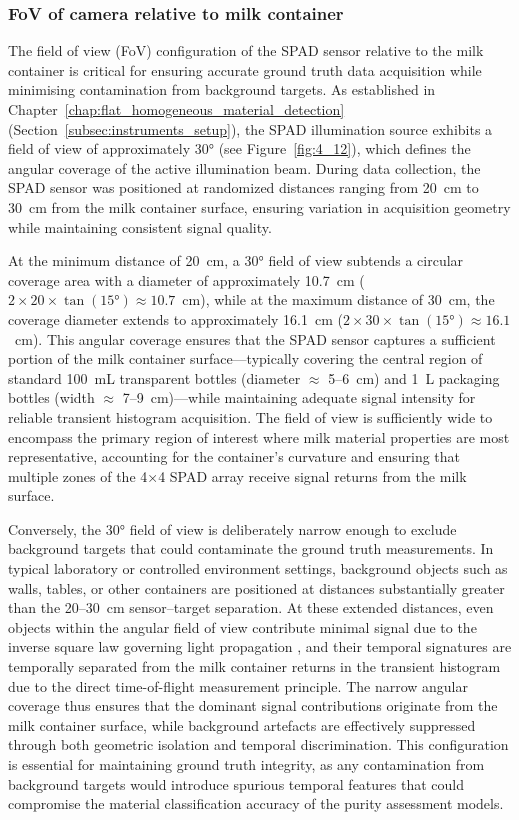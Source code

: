 \documentclass[12pt,a4paper,oneside]{report}
\begin{document}
\subsubsection{FoV of camera relative to milk container}
\label{subsec:fov_of_camera_relative_to_milk_container}

The field of view (FoV) configuration of the SPAD sensor relative to the milk container is critical for ensuring accurate ground truth data acquisition while minimising contamination from background targets. As established in Chapter~\ref{chap:flat_homogeneous_material_detection} (Section~\ref{subsec:instruments_setup}), the SPAD illumination source exhibits a field of view of approximately 30° (see Figure~\ref{fig:4_12}), which defines the angular coverage of the active illumination beam. During data collection, the SPAD sensor was positioned at randomized distances ranging from 20~cm to 30~cm from the milk container surface, ensuring variation in acquisition geometry while maintaining consistent signal quality.

At the minimum distance of 20~cm, a 30° field of view subtends a circular coverage area with a diameter of approximately 10.7~cm ($2 \times 20 \times \tan(15°) \approx 10.7$~cm), while at the maximum distance of 30~cm, the coverage diameter extends to approximately 16.1~cm ($2 \times 30 \times \tan(15°) \approx 16.1$~cm). This angular coverage ensures that the SPAD sensor captures a sufficient portion of the milk container surface—typically covering the central region of standard 100~mL transparent bottles (diameter $\approx$ 5--6~cm) and 1~L packaging bottles (width $\approx$ 7--9~cm)—while maintaining adequate signal intensity for reliable transient histogram acquisition. The field of view is sufficiently wide to encompass the primary region of interest where milk material properties are most representative, accounting for the container's curvature and ensuring that multiple zones of the 4×4 SPAD array receive signal returns from the milk surface.

Conversely, the 30° field of view is deliberately narrow enough to exclude background targets that could contaminate the ground truth measurements. In typical laboratory or controlled environment settings, background objects such as walls, tables, or other containers are positioned at distances substantially greater than the 20--30~cm sensor--target separation. At these extended distances, even objects within the angular field of view contribute minimal signal due to the inverse square law governing light propagation \cite{griffiths2017}, and their temporal signatures are temporally separated from the milk container returns in the transient histogram due to the direct time-of-flight measurement principle. The narrow angular coverage thus ensures that the dominant signal contributions originate from the milk container surface, while background artefacts are effectively suppressed through both geometric isolation and temporal discrimination. This configuration is essential for maintaining ground truth integrity, as any contamination from background targets would introduce spurious temporal features that could compromise the material classification accuracy of the purity assessment models.
\end{document}
